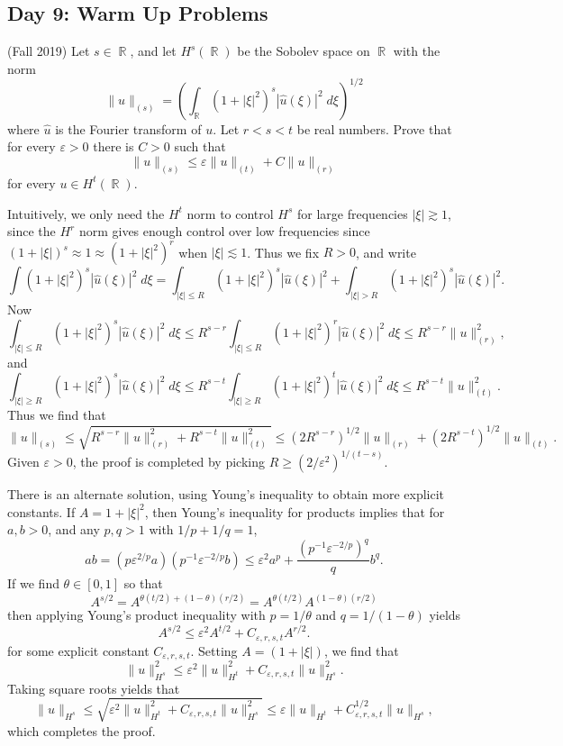 \documentclass[answers]{exam}
\DeclareMathOperator{\RR}{\mathbb{R}}
\begin{document}
\begin{questions}
\newpage
\section{Day 9: Warm Up Problems}

\question (Fall 2019)
    Let $s \in \RR$, and let $H^s(\RR)$ be the Sobolev space on $\RR$ with the norm
    \[ \| u \|_{(s)} = \left( \int_{\RR} (1 + |\xi|^2)^s |\widehat{u}(\xi)|^2\; d\xi \right)^{1/2} \]
    where $\widehat{u}$ is the Fourier transform of $u$. Let $r < s < t$ be real numbers. Prove that for every $\varepsilon > 0$ there is $C > 0$ such that
    \[ \| u \|_{(s)} \leq \varepsilon \| u \|_{(t)} + C \| u \|_{(r)} \]
    for every $u \in H^t(\RR)$.
\begin{solution}
    Intuitively, we only need the $H^t$ norm to control $H^s$ for large frequencies $|\xi| \gtrsim 1$, since the $H^r$ norm gives enough control over low frequencies since $(1 + |\xi|)^s \approx 1 \approx (1 + |\xi|^2)^r$ when $|\xi| \lesssim 1$. Thus we fix $R > 0$, and write
    \[ \int (1 + |\xi|^2)^s |\widehat{u}(\xi)|^2\; d\xi = \int_{|\xi| \leq R} (1 + |\xi|^2)^s |\widehat{u}(\xi)|^2 + \int_{|\xi| > R} (1 + |\xi|^2)^s |\widehat{u}(\xi)|^2. \]
    Now
    \[ \int_{|\xi| \leq R} (1 + |\xi|^2)^s |\widehat{u}(\xi)|^2\; d\xi \leq R^{s-r} \int_{|\xi| \leq R} (1 + |\xi|^2)^r |\widehat{u}(\xi)|^2\; d\xi \leq R^{s-r} \| u \|_{(r)}^2, \]
    and
    \[ \int_{|\xi| \geq R} (1 + |\xi|^2)^s |\widehat{u}(\xi)|^2\; d\xi \leq R^{s-t} \int_{|\xi| \geq R} (1 + |\xi|^2)^t |\widehat{u}(\xi)|^2\; d\xi \leq R^{s-t} \| u \|_{(t)}^2. \]
    Thus we find that
    \[ \| u \|_{(s)} \leq \sqrt{R^{s-r} \| u \|_{(r)}^2 + R^{s-t} \| u \|_{(t)}^2} \leq (2R^{s-r})^{1/2} \| u \|_{(r)} + (2R^{s-t})^{1/2} \| u \|_{(t)}.  \]
    Given $\varepsilon > 0$, the proof is completed by picking $R \geq (2/\varepsilon^2)^{1/(t-s)}$.

    There is an alternate solution, using Young's inequality to obtain more explicit constants. If $A = 1 + |\xi|^2$, then Young's inequality for products implies that for $a,b > 0$, and any $p,q > 1$ with $1/p + 1/q = 1$,
    \[ ab = (p \varepsilon^{2/p} a) ( p^{-1} \varepsilon^{-2/p} b ) \leq \varepsilon^2 a^p + \frac{(p^{-1} \varepsilon^{-2/p})^q}{q} b^q. \]
    If we find $\theta \in [0,1]$ so that
    \[ A^{s/2} = A^{\theta (t/2) + (1 - \theta) (r/2)} = A^{\theta (t/2)} A^{(1 - \theta) (r/2)} \]
    then applying Young's product inequality with $p = 1/\theta$ and $q = 1/(1 - \theta)$ yields
    \[ A^{s/2} \leq \varepsilon^2 A^{t/2} + C_{\varepsilon,r,s,t} A^{r/2}. \]
    for some explicit constant $C_{\varepsilon,r,s,t}$. Setting $A = (1 + |\xi|)$, we find that
    \[ \| u \|_{H^s}^2 \leq \varepsilon^2 \| u \|_{H^t}^2 + C_{\varepsilon,r,s,t} \| u \|_{H^s}^2. \]
    Taking square roots yields that
    \[ \| u \|_{H^s} \leq \sqrt{ \varepsilon^2 \| u \|_{H^t}^2 + C_{\varepsilon,r,s,t} \| u \|_{H^s}^2 } \leq \varepsilon \| u \|_{H^t} + C_{\varepsilon,r,s,t}^{1/2} \| u \|_{H^s}, \]
    which completes the proof.
\end{solution}





\end{questions}
\end{document}
